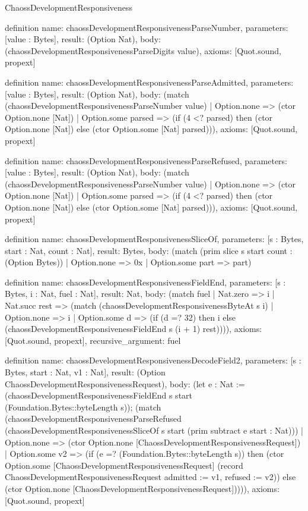 \begin{lexlean}{ChaossDevelopmentResponsiveness}
\begin{semanticmodule}
definition{
  name: chaossDevelopmentResponsivenessParseNumber,
  parameters: [value : Bytes],
  result: (Option Nat),
  body: (chaossDevelopmentResponsivenessParseDigits value),
  axioms: [Quot.sound, propext]
}

definition{
  name: chaossDevelopmentResponsivenessParseAdmitted,
  parameters: [value : Bytes],
  result: (Option Nat),
  body: (match (chaossDevelopmentResponsivenessParseNumber value)
    | Option.none => (ctor Option.none [Nat])
    | Option.some parsed => (if (4 <? parsed) then (ctor Option.none [Nat]) else (ctor Option.some [Nat] parsed))),
  axioms: [Quot.sound, propext]
}

definition{
  name: chaossDevelopmentResponsivenessParseRefused,
  parameters: [value : Bytes],
  result: (Option Nat),
  body: (match (chaossDevelopmentResponsivenessParseNumber value)
    | Option.none => (ctor Option.none [Nat])
    | Option.some parsed => (if (4 <? parsed) then (ctor Option.none [Nat]) else (ctor Option.some [Nat] parsed))),
  axioms: [Quot.sound, propext]
}

definition{
  name: chaossDevelopmentResponsivenessSliceOf,
  parameters: [s : Bytes, start : Nat, count : Nat],
  result: Bytes,
  body: (match (prim slice s start count : (Option Bytes))
    | Option.none => 0x
    | Option.some part => part)
}

definition{
  name: chaossDevelopmentResponsivenessFieldEnd,
  parameters: [s : Bytes, i : Nat, fuel : Nat],
  result: Nat,
  body: (match fuel
    | Nat.zero => i
    | Nat.succ rest => (match (chaossDevelopmentResponsivenessByteAt s i)
      | Option.none => i
      | Option.some d => (if (d =? 32) then i else (chaossDevelopmentResponsivenessFieldEnd s (i + 1) rest)))),
  axioms: [Quot.sound, propext],
  recursive_argument: fuel
}

definition{
  name: chaossDevelopmentResponsivenessDecodeField2,
  parameters: [s : Bytes, start : Nat, v1 : Nat],
  result: (Option ChaossDevelopmentResponsivenessRequest),
  body: (let e : Nat := (chaossDevelopmentResponsivenessFieldEnd s start (Foundation.Bytes::byteLength s)); (match (chaossDevelopmentResponsivenessParseRefused (chaossDevelopmentResponsivenessSliceOf s start (prim subtract e start : Nat)))
    | Option.none => (ctor Option.none [ChaossDevelopmentResponsivenessRequest])
    | Option.some v2 => (if (e =? (Foundation.Bytes::byteLength s)) then (ctor Option.some [ChaossDevelopmentResponsivenessRequest] (record ChaossDevelopmentResponsivenessRequest {admitted := v1, refused := v2})) else (ctor Option.none [ChaossDevelopmentResponsivenessRequest])))),
  axioms: [Quot.sound, propext]
}


\end{semanticmodule}
\end{lexlean}
